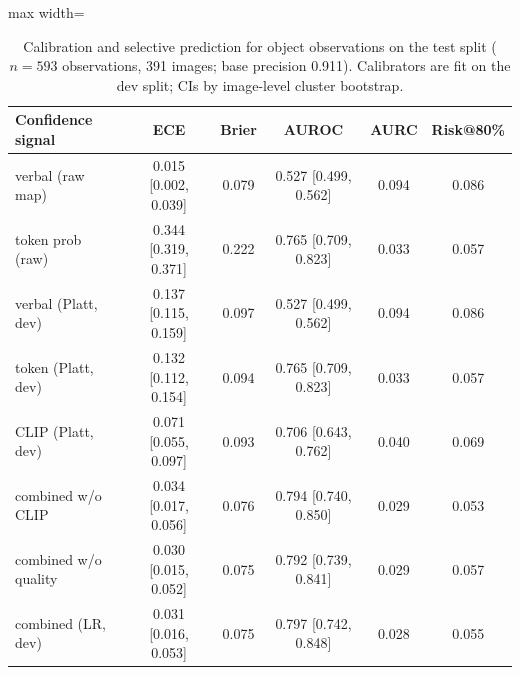 \begin{table}[!t]
\centering
\scriptsize
\caption{Calibration and selective prediction for object observations on the test split ($n=593$ observations, 391 images; base precision 0.911). Calibrators are fit on the dev split; CIs by image-level cluster bootstrap.}
\label{tab:exp6}
\begin{adjustbox}{max width=\textwidth}
\begin{tabular}{lccccc}
\toprule
Confidence signal & ECE & Brier & AUROC & AURC & Risk@80\% \\
\midrule
verbal (raw map) & 0.015 [0.002, 0.039] & 0.079 & 0.527 [0.499, 0.562] & 0.094 & 0.086 \\
token prob (raw) & 0.344 [0.319, 0.371] & 0.222 & 0.765 [0.709, 0.823] & 0.033 & 0.057 \\
verbal (Platt, dev) & 0.137 [0.115, 0.159] & 0.097 & 0.527 [0.499, 0.562] & 0.094 & 0.086 \\
token (Platt, dev) & 0.132 [0.112, 0.154] & 0.094 & 0.765 [0.709, 0.823] & 0.033 & 0.057 \\
CLIP (Platt, dev) & 0.071 [0.055, 0.097] & 0.093 & 0.706 [0.643, 0.762] & 0.040 & 0.069 \\
combined w/o CLIP & 0.034 [0.017, 0.056] & 0.076 & 0.794 [0.740, 0.850] & 0.029 & 0.053 \\
combined w/o quality & 0.030 [0.015, 0.052] & 0.075 & 0.792 [0.739, 0.841] & 0.029 & 0.057 \\
combined (LR, dev) & 0.031 [0.016, 0.053] & 0.075 & 0.797 [0.742, 0.848] & 0.028 & 0.055 \\
\bottomrule
\end{tabular}
\end{adjustbox}
\end{table}
